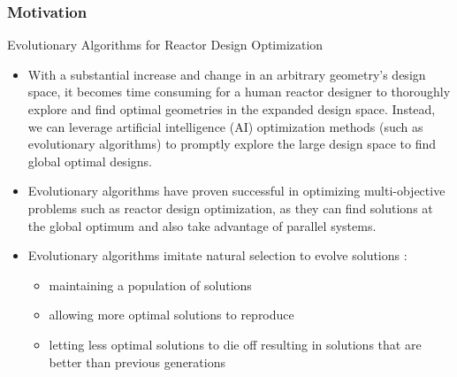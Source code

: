   \begin{frame}
    \frametitle{Motivation}
    \begin{block}{Evolutionary Algorithms for Reactor Design Optimization}
        \begin{itemize}
            \item With a substantial increase and change in an arbitrary geometry's design space, it
            becomes time consuming for a human reactor designer to thoroughly explore and find optimal
            geometries in the expanded design space. Instead, we can leverage artificial intelligence (AI)
            optimization methods (such as evolutionary algorithms) to promptly explore the large design
            space to find global optimal designs.
            \item Evolutionary algorithms have proven successful in optimizing multi-objective 
            problems such as reactor design optimization, as they can find solutions at the global 
            optimum and also take advantage of parallel systems. 
            \item Evolutionary algorithms imitate natural selection to evolve solutions 
            \cite{renner_genetic_2003}:
            \begin{itemize}
                \item maintaining a population of solutions
                \item allowing more optimal solutions to reproduce 
                \item letting less optimal solutions to die off resulting in 
                solutions that are better than previous generations
            \end{itemize}
            \end{itemize}
    \end{block}
  \end{frame}
    